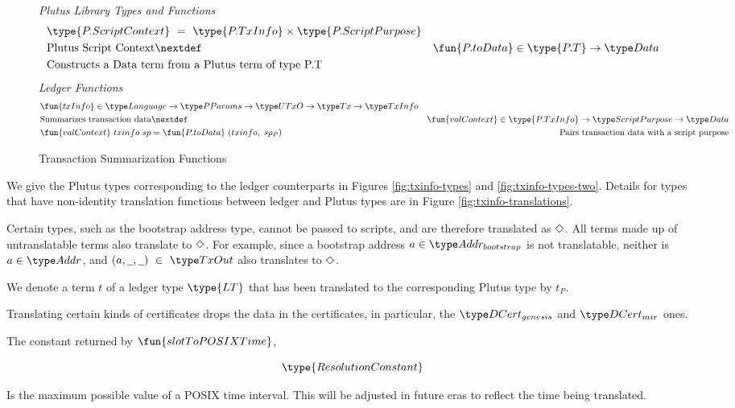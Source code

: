 \begin{figure}
  \emph{Plutus Library Types and Functions}
  \begin{align*}
      &\type{P.ScriptContext} ~=~ \type{P.TxInfo} \times \type{P.ScriptPurpose} \\
      &\text{Plutus Script Context}
      \nextdef
      &\fun{P.toData} \in \type{P.T} \to \Data \\
      &\text{Constructs a Data term from a Plutus term of type P.T}
  \end{align*}
    \emph{Ledger Functions}
    \begin{align*}
        &\fun{txInfo} \in \Language \to \PParams \to \UTxO \to \Tx \to \TxInfo \\
        &\text{Summarizes transaction data}
        \nextdef
        &\fun{valContext} \in \type{P.TxInfo} \to \ScriptPurpose \to \Data \\
        &\fun{valContext}~txinfo~sp = \fun{P.toData}~(txinfo,~sp_{P})
        &\text{Pairs transaction data with a script purpose}
    \end{align*}
  \caption{Transaction Summarization Functions}
  \label{fig:txinfo-funcs}
\end{figure}

We give the Plutus types corresponding to the ledger counterparts in Figures \ref{fig:txinfo-types}
and \ref{fig:txinfo-types-two}. Details for types that have non-identity translation
functions between ledger and Plutus types are in Figure \ref{fig:txinfo-translations}.

Certain types, such as the bootstrap address type, cannot be passed to scripts, and
are therefore translated as $\Diamond$. All terms made up of untranslatable
terms also translate to $\Diamond$. For example, since a bootstrap address $a \in \AddrBS$
is not translatable, neither is $a\in\Addr$, and $(a,\wcard,\wcard)~\in~\TxOut$
also translates to $\Diamond$.

We denote a term $t$ of a ledger type $\type{LT}$ that has been translated to the
corresponding Plutus type by $t_P$.

Translating certain kinds of certificates drops the data in the
certificates, in particular, the $\DCertGen$ and $\DCertMir$ ones.

The constant returned by $\fun{slotToPOSIXTime}$,

\[\type{ResolutionConstant}\]

Is the maximum possible value of a POSIX time interval. This will be adjusted in
future eras to reflect the time being translated.


